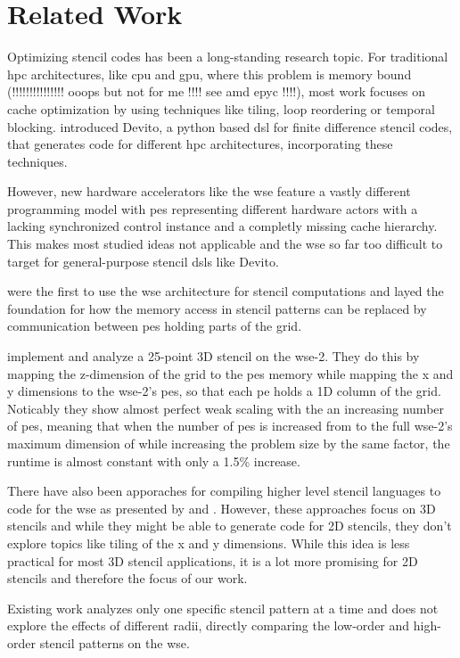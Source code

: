 \chapter{Related Work}
Optimizing stencil codes has been a long-standing research topic.
For traditional \ac{hpc} architectures, like \ac{cpu} and \ac{gpu}, where this problem is memory bound (!!!!!!!!!!!!!!! ooops but not for me !!!! see amd epyc !!!!), most work focuses on cache optimization by using techniques like tiling, loop reordering or temporal blocking.
\textcite{lange2016devito} introduced Devito, a python based \ac{dsl} for finite difference stencil codes, that generates code for different \ac{hpc} architectures, incorporating these techniques.

However, new hardware accelerators like the \ac{wse} feature a vastly different programming model with \acp{pe} representing different hardware actors with a lacking synchronized control instance and a completly missing cache hierarchy. This makes most studied ideas not applicable and the \ac{wse} so far too difficult to target for general-purpose stencil \ac{dsl}s like Devito.

\textcite{rocki2020fast} were the first to use the \ac{wse} architecture for stencil computations and layed the foundation for how the memory access in stencil patterns can be replaced by communication between \ac{pe}s holding parts of the grid.

\textcite{jacquelin2022massively} implement and analyze a 25-point 3D stencil on the \ac{wse}-2.
They do this by mapping the z-dimension of the grid to the \ac{pe}s memory while mapping the x and y dimensions to the \ac{wse}-2's \ac{pe}s, so that each \ac{pe} holds a 1D column of the grid.
Noticably they show almost perfect weak scaling with the an increasing number of \ac{pe}s, meaning that when the number of \ac{pe}s is increased from  to the full \ac{wse}-2's maximum dimension of  while increasing the problem size by the same factor, the runtime is almost constant with only a 1.5\% increase.

There have also been apporaches for compiling higher level stencil languages to code for the \ac{wse} as presented by \textcite{woo2022disruptive} and \textcite{sai2024automated}. However, these approaches focus on 3D stencils and while they might be able to generate code for 2D stencils, they don't explore topics like tiling of the x and y dimensions. While this idea is less practical for most 3D stencil applications, it is a lot more promising for 2D stencils and therefore the focus of our work.

Existing work analyzes only one specific stencil pattern at a time and does not explore the effects of different radii, directly comparing the low-order and high-order stencil patterns on the \ac{wse}.